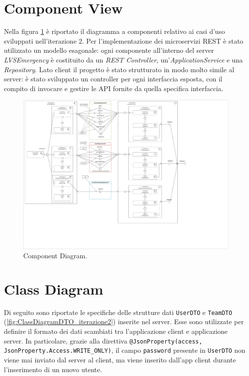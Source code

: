 \section{Component View}
Nella figura \ref{fig:ComponentDiagram_iterazione2} è riportato il diagramma a componenti relativo ai casi d'uso sviluppati nell'iterazione 2. Per l'implementazione dei microservizi REST è stato utilizzato un modello esagonale: ogni componente all'interno del server \textit{LVSEmergency} è costituito da un \textit{REST Controller}, un'\textit{ApplicationService} e una \textit{Repository}.
Lato client il progetto è stato strutturato in modo molto simile al server: è stato sviluppato un controller per ogni interfaccia esposta, con il compito di invocare e gestire le API fornite da quella specifica interfaccia. 

\begin{figure}[h!]
	\centering
	\includegraphics[width=1\linewidth]{./Iterazione 2/OtherFiles/UML - Component View}
	\caption{Component Diagram.}
	\label{fig:ComponentDiagram_iterazione2}
\end{figure}

\clearpage

\section{Class Diagram}
Di seguito sono riportate le specifiche delle strutture dati \texttt{UserDTO} e \texttt{TeamDTO} (\Fig\ref{fig:ClassDiagramDTO_iterazione2}) inserite nel server. Esse sono utilizzate per definire il formato dei dati scambiati tra l'applicazione client e applicazione server. In particolare, grazie alla direttiva \texttt{@JsonProperty(access, JsonProperty.Access.WRITE\_ONLY)}, il campo \texttt{password} presente in \texttt{UserDTO} non viene mai inviato dal server al client, ma viene inserito dall'app client durante l'inserimento di un nuovo utente.  


